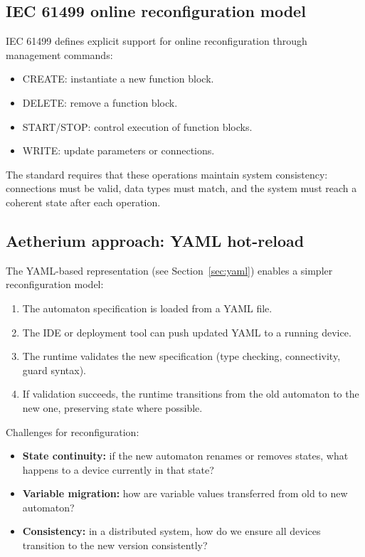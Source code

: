 \subsection{IEC 61499 online reconfiguration model}

IEC 61499 defines explicit support for online reconfiguration through management commands:
\begin{itemize}
  \item CREATE: instantiate a new function block.
  \item DELETE: remove a function block.
  \item START/STOP: control execution of function blocks.
  \item WRITE: update parameters or connections.
\end{itemize}

The standard requires that these operations maintain system consistency: connections must be valid, data types must match, and the system must reach a coherent state after each operation.

\subsection{Aetherium approach: YAML hot-reload}

The YAML-based representation (see Section~\ref{sec:yaml}) enables a simpler reconfiguration model:
\begin{enumerate}
  \item The automaton specification is loaded from a YAML file.
  \item The IDE or deployment tool can push updated YAML to a running device.
  \item The runtime validates the new specification (type checking, connectivity, guard syntax).
  \item If validation succeeds, the runtime transitions from the old automaton to the new one, preserving state where possible.
\end{enumerate}

Challenges for reconfiguration:
\begin{itemize}
  \item \textbf{State continuity:} if the new automaton renames or removes states, what happens to a device currently in that state?
  \item \textbf{Variable migration:} how are variable values transferred from old to new automaton?
  \item \textbf{Consistency:} in a distributed system, how do we ensure all devices transition to the new version consistently?
\end{itemize}

